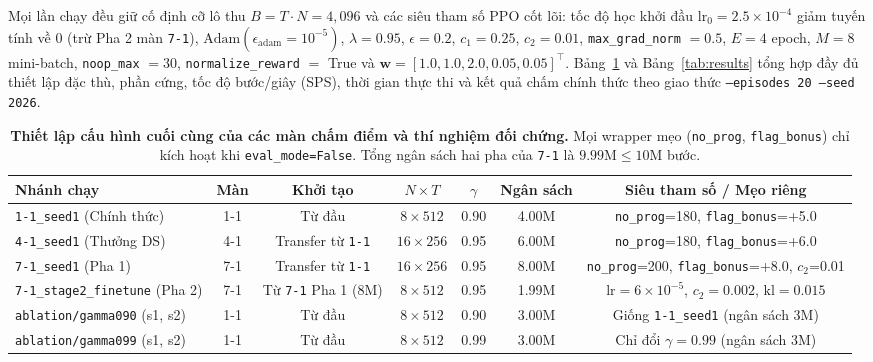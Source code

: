 \documentclass[a4paper,10pt]{article}
\begin{document}
Mọi lần chạy đều giữ cố định cỡ lô thu $B = T \cdot N = 4{,}096$ và các siêu tham số PPO cốt lõi: tốc độ học khởi đầu $\text{lr}_0 = 2.5\times 10^{-4}$ giảm tuyến tính về $0$ (trừ Pha 2 màn \texttt{7-1}), $\text{Adam}(\epsilon_{\text{adam}} = 10^{-5})$, $\lambda = 0.95$, $\epsilon = 0.2$, $c_1 = 0.25$, $c_2 = 0.01$, \texttt{max\_grad\_norm} $= 0.5$, $E = 4$ epoch, $M = 8$ mini-batch, \texttt{noop\_max} $= 30$, \texttt{normalize\_reward} $=$ True và $\mathbf{w} = [1.0, 1.0, 2.0, 0.05, 0.05]^\top$. Bảng~\ref{tab:configs} và Bảng~\ref{tab:results} tổng hợp đầy đủ thiết lập đặc thù, phần cứng, tốc độ bước/giây (SPS), thời gian thực thi và kết quả chấm chính thức theo giao thức \texttt{--episodes 20 --seed 2026}.

\begin{table}[!htbp]
  \centering
  \caption{\textbf{Thiết lập cấu hình cuối cùng của các màn chấm điểm và thí nghiệm đối chứng.} Mọi wrapper mẹo (\texttt{no\_prog}, \texttt{flag\_bonus}) chỉ kích hoạt khi \texttt{eval\_mode=False}. Tổng ngân sách hai pha của \texttt{7-1} là $9.99\text{M} \le 10\text{M}$ bước.}
  \label{tab:configs}
  \footnotesize
  \begin{tabular}{@{}lcccccc@{}}
    \toprule
    \textbf{Nhánh chạy} & \textbf{Màn} & \textbf{Khởi tạo} & $N \times T$ & $\gamma$ & \textbf{Ngân sách} & \textbf{Siêu tham số / Mẹo riêng} \\
    \midrule
    \texttt{1-1\_seed1} (Chính thức)   & 1-1 & Từ đầu & $8 \times 512$ & 0.90 & 4.00M & \texttt{no\_prog}=180, \texttt{flag\_bonus}=+5.0 \\
    \texttt{4-1\_seed1} (Thưởng DS)    & 4-1 & Transfer từ \texttt{1-1} & $16 \times 256$ & 0.95 & 6.00M & \texttt{no\_prog}=180, \texttt{flag\_bonus}=+6.0 \\
    \texttt{7-1\_seed1} (Pha 1)        & 7-1 & Transfer từ \texttt{1-1} & $16 \times 256$ & 0.95 & 8.00M & \texttt{no\_prog}=200, \texttt{flag\_bonus}=+8.0, $c_2$=0.01 \\
    \texttt{7-1\_stage2\_finetune} (Pha 2) & 7-1 & Từ \texttt{7-1} Pha 1 (8M) & $8 \times 512$ & 0.95 & 1.99M & $\text{lr}=6\times 10^{-5}$, $c_2=0.002$, $\text{kl}=0.015$ \\
    \texttt{ablation/gamma090} (s1, s2) & 1-1 & Từ đầu & $8 \times 512$ & 0.90 & 3.00M & Giống \texttt{1-1\_seed1} (ngân sách 3M) \\
    \texttt{ablation/gamma099} (s1, s2) & 1-1 & Từ đầu & $8 \times 512$ & 0.99 & 3.00M & Chỉ đổi $\gamma = 0.99$ (ngân sách 3M) \\
    \bottomrule
  \end{tabular}
\end{table}
\end{document}
